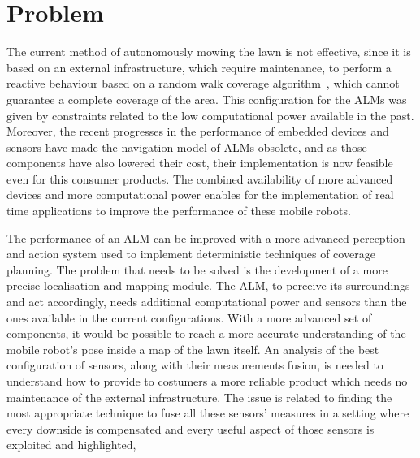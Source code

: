 \section{Problem}

\noindent
The current method of autonomously mowing the lawn is not effective, since it is based on an external infrastructure, which require maintenance, to perform a reactive behaviour based on a random walk coverage algorithm~\cite{karol_ardic_conditional_2016}, which cannot guarantee a complete coverage of the area.
This configuration for the \glspl{ALM} was given by constraints related to the low computational power available in the past.
Moreover, the recent progresses in the performance of embedded devices and sensors have made the navigation model of \glspl{ALM} obsolete, and as those components have also lowered their cost, their implementation is now feasible even for this consumer products.
The combined availability of more advanced devices and more computational power enables for the implementation of real time applications to improve the performance of these mobile robots.


The performance of an \gls{ALM} can be improved with a more advanced perception and action system used to implement deterministic techniques of coverage planning.
The problem that needs to be solved is the development of a more precise localisation and mapping module.
The \gls{ALM}, to perceive its surroundings and act accordingly, needs additional computational power and sensors than the ones available in the current configurations.
With a more advanced set of components, it would be possible to reach a more accurate understanding of the mobile robot's pose inside a map of the lawn itself.
An analysis of the best configuration of sensors, along with their measurements fusion, is needed to understand how to provide to costumers a more reliable product which needs no maintenance of the external infrastructure.
The issue is related to finding the most appropriate technique to fuse all these sensors' measures in a setting where every downside is compensated and every useful aspect of those sensors is exploited and highlighted,


